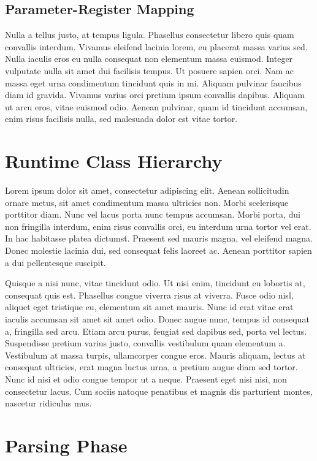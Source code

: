 \documentclass[12pt,twoside,notitlepage]{report}
\begin{document}
\subsection{Parameter-Register Mapping}

Nulla a tellus justo, at tempus ligula. Phasellus consectetur libero quis quam convallis interdum. Vivamus eleifend lacinia lorem, eu placerat massa varius sed. Nulla iaculis eros eu nulla consequat non elementum massa euismod. Integer vulputate nulla sit amet dui facilisis tempus. Ut posuere sapien orci. Nam ac massa eget urna condimentum tincidunt quis in mi. Aliquam pulvinar faucibus diam id gravida. Vivamus varius orci pretium ipsum convallis dapibus. Aliquam ut arcu eros, vitae euismod odio. Aenean pulvinar, quam id tincidunt accumsan, enim risus facilisis nulla, sed malesuada dolor est vitae tortor.

\section{Runtime Class Hierarchy}

Lorem ipsum dolor sit amet, consectetur adipiscing elit. Aenean sollicitudin ornare metus, sit amet condimentum massa ultricies non. Morbi scelerisque porttitor diam. Nunc vel lacus porta nunc tempus accumsan. Morbi porta, dui non fringilla interdum, enim risus convallis orci, eu interdum urna tortor vel erat. In hac habitasse platea dictumst. Praesent sed mauris magna, vel eleifend magna. Donec molestie lacinia dui, sed consequat felis laoreet ac. Aenean porttitor sapien a dui pellentesque suscipit.

Quisque a nisi nunc, vitae tincidunt odio. Ut nisi enim, tincidunt eu lobortis at, consequat quis est. Phasellus congue viverra risus at viverra. Fusce odio nisl, aliquet eget tristique eu, elementum sit amet mauris. Nunc id erat vitae erat iaculis accumsan sit amet sit amet odio. Donec augue nunc, tempus id consequat a, fringilla sed arcu. Etiam arcu purus, feugiat sed dapibus sed, porta vel lectus. Suspendisse pretium varius justo, convallis vestibulum quam elementum a. Vestibulum at massa turpis, ullamcorper congue eros. Mauris aliquam, lectus at consequat ultricies, erat magna luctus urna, a pretium augue diam sed tortor. Nunc id nisi et odio congue tempor ut a neque. Praesent eget nisi nisi, non consectetur lacus. Cum sociis natoque penatibus et magnis dis parturient montes, nascetur ridiculus mus.

\section{Parsing Phase}
\end{document}

